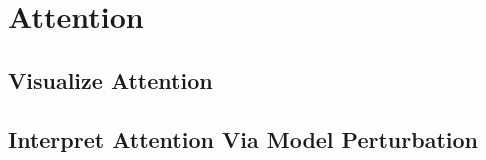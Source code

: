 \section{Attention}

\subsection{Visualize Attention}




\subsection{Interpret Attention Via Model Perturbation}
